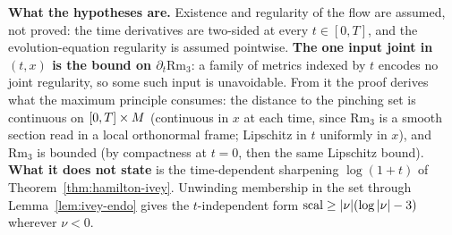 \begin{theorem}
  \textbf{What the hypotheses are.} Existence and regularity of the flow are assumed, not proved:
  the time derivatives are two-sided at every $t\in[0,T]$, and the evolution-equation regularity
  is assumed pointwise. \textbf{The one input joint in $(t,x)$ is the bound on
  $\partial_t\mathrm{Rm}_3$}: a family of metrics indexed by $t$ encodes no joint regularity, so
  some such input is unavoidable. From it the proof derives what the maximum principle consumes:
  the distance to the pinching set is continuous on $[0,T]\times M$ (continuous in $x$ at each
  time, since $\mathrm{Rm}_3$ is a smooth section read in a local orthonormal frame; Lipschitz in
  $t$ uniformly in $x$), and $\mathrm{Rm}_3$ is bounded (by compactness at $t = 0$, then the same
  Lipschitz bound). \textbf{What it does not state} is the
  time-dependent sharpening $\log(1+t)$ of Theorem~\ref{thm:hamilton-ivey}. Unwinding membership
  in the set through Lemma~\ref{lem:ivey-endo} gives the $t$-independent form
  $\operatorname{scal} \ge |\nu|(\log|\nu| - 3)$ wherever $\nu < 0$.
\end{theorem}

